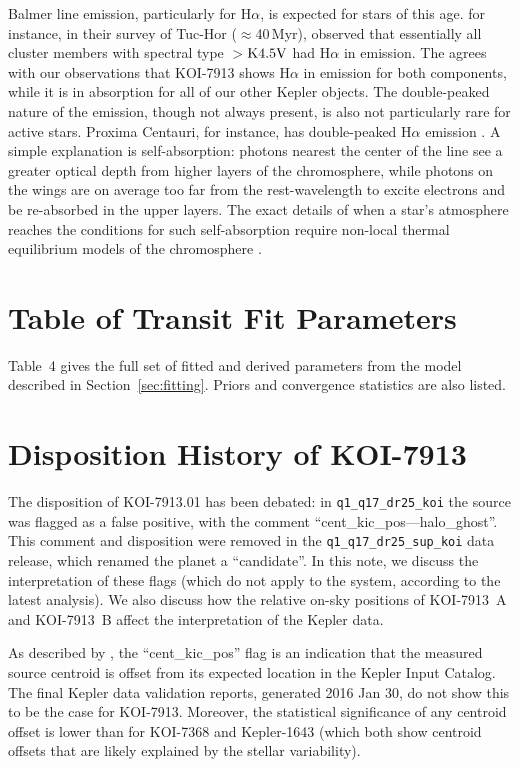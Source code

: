 \documentclass[12pt,twocolumn]{aastex63}
\begin{document}
Balmer line emission, particularly for H$\alpha$, is expected for
stars of this age.  \citet{kraus_stellar_2014} for instance, in their
survey of Tuc-Hor ($\approx$40\,Myr), observed that essentially all
cluster members with spectral type $>$${\rm K4.5V}$ had H$\alpha$ in
emission.  The agrees with our observations that KOI-7913 shows
H$\alpha$ in emission for both components, while it is in absorption
for all of our other Kepler objects.  The double-peaked nature of the
emission, though not always present, is also not particularly rare for
active stars.  Proxima Centauri, for instance, has double-peaked
H$\alpha$ emission \citep{collins_calculations_2017}.  A simple
explanation is self-absorption: photons nearest the center of the line
see a greater optical depth from higher layers of the chromosphere,
while photons on the wings are on average too far from the
rest-wavelength to excite electrons and be re-absorbed in the upper
layers.  The exact details of when a star's atmosphere reaches the
conditions for such self-absorption require non-local thermal
equilibrium models of the chromosphere
\citep{short_chromospheric_1998,2005A&A...439.1137F}.


\section{Table of Transit Fit Parameters}
\label{app:transit}

Table~4 gives the full set of fitted and derived
parameters from the model described in Section~\ref{sec:fitting}.
Priors and convergence statistics are also listed.


\section{Disposition History of KOI-7913}
\label{app:koi7913}

The disposition of KOI-7913.01 has been debated: in
\texttt{q1\_q17\_dr25\_koi} the source was flagged as a false
positive, with the comment ``cent\_kic\_pos---halo\_ghost''.  This
comment and disposition were removed in the
\texttt{q1\_q17\_dr25\_sup\_koi} data release, which renamed the
planet a ``candidate''.  In this note, we discuss the interpretation
of these flags (which do not apply to the system, according to the
latest analysis).  We also discuss how the relative on-sky positions of
KOI-7913~A and KOI-7913~B affect the interpretation of the Kepler
data.

As described by \citet{thompson_planetary_2018}, the
``cent\_kic\_pos'' flag is an indication that the measured source
centroid is offset from its expected location in the Kepler Input
Catalog.  The final Kepler data validation reports, generated 2016 Jan
30, do not show this to be the case for KOI-7913.  Moreover, the
statistical significance of any centroid offset is lower than for
KOI-7368 and Kepler-1643 (which both show centroid offsets that are
likely explained by the stellar variability).
\end{document}
